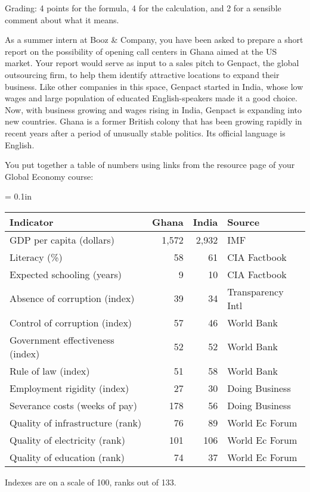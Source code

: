 \documentclass[letterpaper,12pt]{exam}
\begin{document}
\begin{questions}
\begin{solution}
\begin{parts}
Grading:  4 points for the formula, 4 for the calculation, 
and 2 for a sensible comment about what it means.  

\end{parts}
\end{solution}

As a summer intern at Booz \& Company, you have been asked to 
prepare a short report on the possibility of 
opening call centers in Ghana aimed at the US market.  
Your report would serve as input to a sales pitch to Genpact, 
the global outsourcing firm, 
to help them identify attractive locations to expand their business.  
Like other companies in this space, Genpact started in India, 
whose low wages and large population of educated English-speakers
made it a good choice.
Now, with business growing and wages rising in India, 
Genpact is expanding into new countries.   
Ghana is a former British colony that has been growing rapidly 
in recent years after a period of unusually stable politics.  
Its official language is English.  

You put together a table of numbers using links from 
the resource page of your Global Economy course:   
%
\begin{center}
\tabcolsep = 0.1in
\begin{tabular}{lrrl}
\toprule 
Indicator   &  Ghana    &  India   &  Source  \\
\midrule 
GDP per capita (dollars) &  1,572 & 2,932 &  IMF \\
Literacy (\%)           &    58     &  61   &  CIA Factbook \\
Expected schooling (years) &  9 & 10  &  CIA Factbook \\
Absence of corruption (index) &  39 & 34 & Transparency Intl \\
Control of corruption (index) &  57 & 46 & World Bank \\
Government effectiveness (index) & 52 & 52 & World Bank \\
Rule of law (index)           & 51 & 58    & World Bank \\
Employment rigidity (index)   & 27 & 30 & Doing Business \\
Severance costs (weeks of pay) & 178  & 56 & Doing Business \\
Quality of infrastructure (rank) & 76 & 89   & World Ec Forum \\
Quality of electricity (rank)  &  101 & 106  & World Ec Forum \\
Quality of education (rank)    &  74  & 37   & World Ec Forum \\
\bottomrule 
\end{tabular}
\end{center}
%
Indexes are on a scale of 100, ranks out of 133.  


\end{questions}
\end{document}
